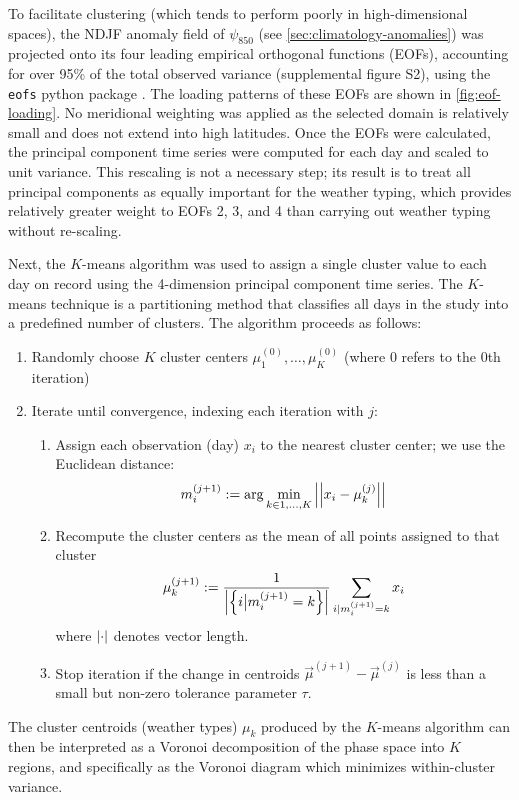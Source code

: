 \documentclass[twocol]{ametsoc}
\begin{document}
To facilitate clustering (which tends to perform poorly in high-dimensional spaces), the NDJF anomaly field of $\psi_{850}$ (see \cref{sec:climatology-anomalies}) was projected  onto its four leading empirical orthogonal functions (EOFs), accounting for over 95\% of the total observed variance (supplemental figure S2), using the \texttt{eofs} python package \citep{Dawson:2016ge}.
The loading patterns of these EOFs are shown in \cref{fig:eof-loading}.
No meridional weighting was applied as the selected domain is relatively small and does not extend into high latitudes.
Once the EOFs were calculated, the principal component time series were computed for each day and scaled to unit variance.
This rescaling is not a necessary step; its result is to treat all principal components as equally important for the weather typing, which provides relatively greater weight to EOFs 2, 3, and 4 than carrying out weather typing without re-scaling.

Next, the $K$-means algorithm was used to assign a single cluster value to each day on record using the 4-dimension principal component time series.
The $K$-means technique is a partitioning method that classifies all days in the study into a predefined number of clusters.
The algorithm proceeds as follows:
\begin{enumerate}
	\item Randomly choose $K$ cluster centers $\mu_1^{(0)}, \ldots, \mu_K^{(0)}$ (where $0$ refers to the $0$th iteration)
	\item Iterate until convergence, indexing each iteration with $j$:
	\begin{enumerate}
		\item Assign each observation (day) $x_i$ to the nearest cluster center; we use the Euclidean distance:
		\begin{equation}
			m_i^{(j+1)} := \arg\min_{k\in 1,\ldots,K} \abs{\abs{x_i - \mu_k^{(j)}}}
		\end{equation}
		\item Recompute the cluster centers as the mean of all points assigned to that cluster
		\begin{equation}
			\mu_k^{(j+1)} := \frac{1}{\abs{\qty{i \big| m_i^{(j+1)}=k}}} \sum_{i | m_i^{(j+1)}=k} x_i
		\end{equation}
		where $\abs{\cdot}$ denotes vector length.
		\item Stop iteration if the change in centroids $\vec{\mu}^{(j+1)} - \vec{\mu}^{(j)}$ is less than a small but non-zero tolerance parameter $\tau$.
	\end{enumerate}
\end{enumerate}
The cluster centroids (weather types) $\mu_k$ produced by the $K$-means algorithm can then be interpreted as a Voronoi decomposition of the phase space into $K$ regions, and specifically as the Voronoi diagram which minimizes within-cluster variance.
\end{document}
